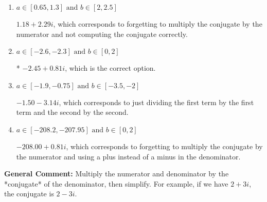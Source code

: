 \documentclass{extbook}[14pt]
\begin{document}
\begin{enumerate}
{\begin{enumerate}[label=\Alph*.]
 $-2.45  + 69.00 i$, which corresponds to forgetting to multiply the conjugate by the numerator.
\item \( a \in [0.65, 1.3] \text{ and } b \in [2, 2.5] \)

 $1.18  + 2.29 i$, which corresponds to forgetting to multiply the conjugate by the numerator and not computing the conjugate correctly.
\item \( a \in [-2.6, -2.3] \text{ and } b \in [0, 2] \)

* $-2.45  + 0.81 i$, which is the correct option.
\item \( a \in [-1.9, -0.75] \text{ and } b \in [-3.5, -2] \)

 $-1.50  - 3.14 i$, which corresponds to just dividing the first term by the first term and the second by the second.
\item \( a \in [-208.2, -207.95] \text{ and } b \in [0, 2] \)

 $-208.00  + 0.81 i$, which corresponds to forgetting to multiply the conjugate by the numerator and using a plus instead of a minus in the denominator.
\end{enumerate}

\textbf{General Comment:} Multiply the numerator and denominator by the *conjugate* of the denominator, then simplify. For example, if we have $2+3i$, the conjugate is $2-3i$.
}
\end{enumerate}
\end{document}
